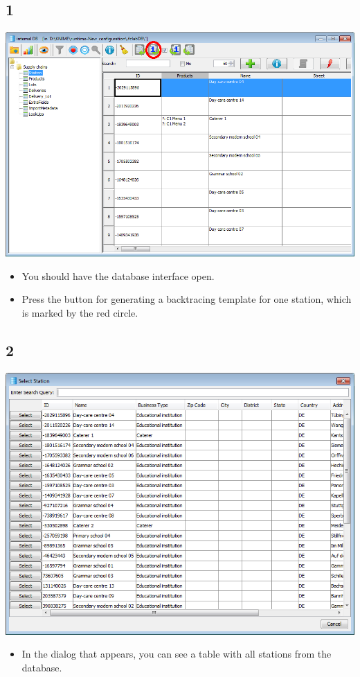 \documentclass{beamer}
\begin{document}
\subsection{1}
\begin{frame}
	\begin{center}
  		\includegraphics[height=0.6\textheight]{1.png}
	\end{center}
	\begin{itemize}
		\item You should have the database interface open.
		\item Press the button for generating a backtracing template for one station, which is marked by the red circle.
	\end{itemize}
\end{frame}

\subsection{2}
\begin{frame}
	\begin{center}
  		\includegraphics[height=0.5\textheight]{2.png}
	\end{center}
	\begin{itemize}
		\item In the dialog that appears, you can see a table with all stations from the database.
	\end{itemize}
\end{frame}
\end{document}
